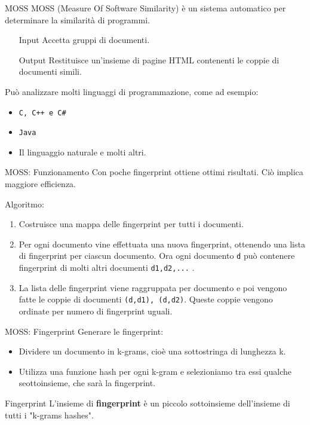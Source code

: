 \documentclass{beamer}
\begin{document}
	\begin{frame}{MOSS}
		MOSS (Measure Of Software Similarity) è un sistema automatico per determinare la similarità di programmi.
		
		\begin{itemize}
			\item[Input] Accetta gruppi di documenti.
			\item[Output] Restituisce un'insieme di pagine HTML contenenti le coppie di documenti simili.
		\end{itemize}
		
		\pause
		Può analizzare molti linguaggi di programmazione, come ad esempio:
		\begin{itemize}
			\item \texttt{C, C++ e C\#}
			\item \texttt{Java}
			\item Il linguaggio naturale e molti altri.
		\end{itemize}
	\end{frame}

	\begin{frame}{MOSS: Funzionamento}
		Con poche fingerprint ottiene ottimi risultati. Ciò implica maggiore efficienza.
		
		Algoritmo:
		\begin{enumerate}[<+->]
			\item Costruisce una mappa delle fingerprint per tutti i documenti.
			\item Per ogni documento vine effettuata una nuova fingerprint, ottenendo una lista di fingerprint per ciascun documento. Ora ogni documento \texttt{d} può contenere fingerprint di molti altri documenti \texttt{d1,d2,...} .
			\item La lista delle fingerprint viene raggruppata per documento e poi vengono fatte le coppie di documenti \texttt{(d,d1), (d,d2)}.
			Queste coppie vengono ordinate per numero di fingerprint uguali.
			
		\end{enumerate}
	\end{frame}
	
	\begin{frame}{MOSS: Fingerprint}
		Generare le fingerprint:
		\begin{itemize}[<+->]
			\item Dividere un documento in k-grams, cioè una sottostringa di lunghezza k.
			\item Utilizza una funzione hash per ogni k-gram e selezioniamo tra essi qualche seottoinsieme, che sarà la fingerprint.
		\end{itemize}
		\pause
		\begin{alertblock}{Fingerprint}
			L'insieme di \textbf{fingerprint} è un piccolo sottoinsieme dell'insieme di tutti i "k-grams hashes".
		\end{alertblock}
	\end{frame}
\end{document}
